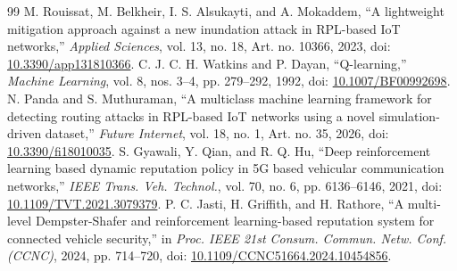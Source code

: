 \begin{thebibliography}{99}
 M. Rouissat, M. Belkheir, I. S. Alsukayti, and A. Mokaddem, ``A lightweight mitigation approach against a new inundation attack in RPL-based IoT networks,'' \emph{Applied Sciences}, vol. 13, no. 18, Art. no. 10366, 2023, doi: \href{https://doi.org/10.3390/app131810366}{10.3390/app131810366}.
 C. J. C. H. Watkins and P. Dayan, ``Q-learning,'' \emph{Machine Learning}, vol. 8, nos. 3--4, pp. 279--292, 1992, doi: \href{https://doi.org/10.1007/BF00992698}{10.1007/BF00992698}.
 N. Panda and S. Muthuraman, ``A multiclass machine learning framework for detecting routing attacks in RPL-based IoT networks using a novel simulation-driven dataset,'' \emph{Future Internet}, vol. 18, no. 1, Art. no. 35, 2026, doi: \href{https://doi.org/10.3390/fi18010035}{10.3390/fi18010035}.
 S. Gyawali, Y. Qian, and R. Q. Hu, ``Deep reinforcement learning based dynamic reputation policy in 5G based vehicular communication networks,'' \emph{IEEE Trans. Veh. Technol.}, vol. 70, no. 6, pp. 6136--6146, 2021, doi: \href{https://doi.org/10.1109/TVT.2021.3079379}{10.1109/TVT.2021.3079379}.
 P. C. Jasti, H. Griffith, and H. Rathore, ``A multi-level Dempster-Shafer and reinforcement learning-based reputation system for connected vehicle security,'' in \emph{Proc. IEEE 21st Consum. Commun. Netw. Conf. (CCNC)}, 2024, pp. 714--720, doi: \href{https://doi.org/10.1109/CCNC51664.2024.10454856}{10.1109/CCNC51664.2024.10454856}.
\end{thebibliography}
